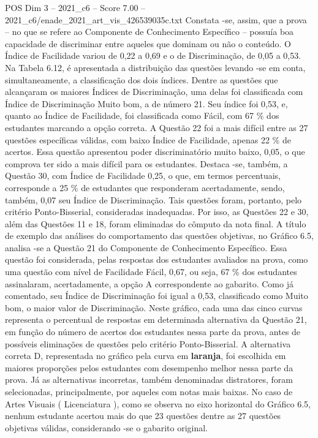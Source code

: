 \begin{textsample}{POS Dim 3 – 2021\_c6 – Score 7.00 – 2021\_c6/enade\_2021\_art\_vis\_426539035c.txt}
Constata -se, assim, que a prova – no que se refere ao Componente de Conhecimento Específico – possuía boa capacidade de discriminar entre aqueles que dominam ou não o conteúdo.
O Índice de Facilidade variou de 0,22 a 0,69 e o de Discriminação, de 0,05 a 0,53.
Na Tabela 6.12, é apresentada a distribuição das questões levando -se em conta, simultaneamente, a classificação dos dois índices.
Dentre as questões que alcançaram os maiores Índices de Discriminação, uma delas foi classificada com Índice de Discriminação Muito bom, a de número 21.
Seu índice foi 0,53, e, quanto ao Índice de Facilidade, foi classificada como Fácil, com 67 \% dos estudantes marcando a opção correta.
A Questão 22 foi a mais difícil entre as 27 questões específicas válidas, com baixo Índice de Facilidade, apenas 22 \% de acertos.
Essa questão apresentou poder discriminatório muito baixo, 0,05, o que comprova ter sido a mais difícil para os estudantes.
Destaca -se, também, a Questão 30, com Índice de Facilidade 0,25, o que, em termos percentuais, corresponde a 25 \% de estudantes que responderam acertadamente, sendo, também, 0,07 seu Índice de Discriminação.
Tais questões foram, portanto, pelo critério Ponto-Bisserial, consideradas inadequadas.
Por isso, as Questões 22 e 30, além das Questões 11 e 18, foram eliminadas do cômputo da nota final.
A título de exemplo das análises do comportamento das questões objetivas, no Gráfico 6.5, analisa -se a Questão 21 do Componente de Conhecimento Específico.
Essa questão foi considerada, pelas respostas dos estudantes avaliados na prova, como uma questão com nível de Facilidade Fácil, 0,67, ou seja, 67 \% dos estudantes assinalaram, acertadamente, a opção A correspondente ao gabarito.
Como já comentado, seu Índice de Discriminação foi igual a 0,53, classificado como Muito bom, o maior valor de Discriminação.
Neste gráfico, cada uma das cinco curvas representa o percentual de respostas em determinada alternativa da Questão 21, em função do número de acertos dos estudantes nessa parte da prova, antes de possíveis eliminações de questões pelo critério Ponto-Bisserial.
A alternativa correta D, representada no gráfico pela curva em \textbf{laranja}, foi escolhida em maiores proporções pelos estudantes com desempenho melhor nessa parte da prova.
Já as alternativas incorretas, também denominadas distratores, foram selecionadas, principalmente, por aqueles com notas mais baixas.
No caso de Artes Visuais ( Licenciatura ), como se observa no eixo horizontal do Gráfico 6.5, nenhum estudante acertou mais do que 23 questões dentre as 27 questões objetivas válidas, considerando -se o gabarito original.

\end{textsample}
